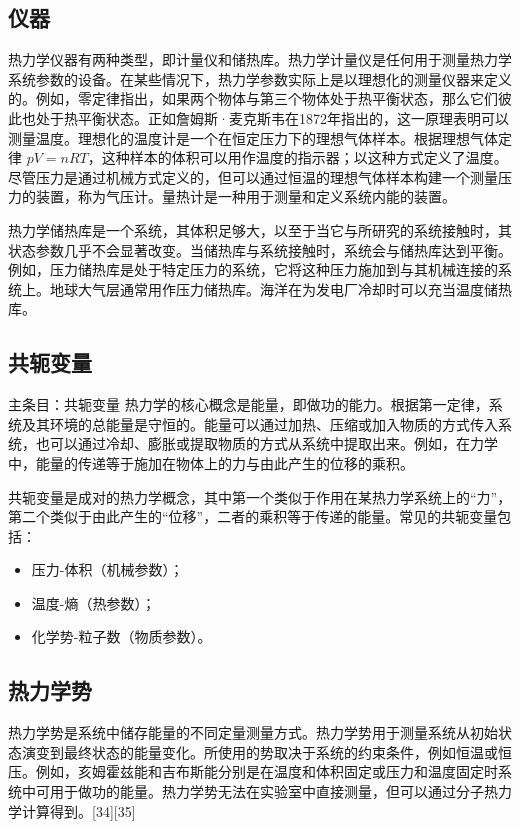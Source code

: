 \subsection{仪器} 
热力学仪器有两种类型，即计量仪和储热库。热力学计量仪是任何用于测量热力学系统参数的设备。在某些情况下，热力学参数实际上是以理想化的测量仪器来定义的。例如，零定律指出，如果两个物体与第三个物体处于热平衡状态，那么它们彼此也处于热平衡状态。正如詹姆斯·麦克斯韦在1872年指出的，这一原理表明可以测量温度。理想化的温度计是一个在恒定压力下的理想气体样本。根据理想气体定律 \( pV = nRT \)，这种样本的体积可以用作温度的指示器；以这种方式定义了温度。尽管压力是通过机械方式定义的，但可以通过恒温的理想气体样本构建一个测量压力的装置，称为气压计。量热计是一种用于测量和定义系统内能的装置。

热力学储热库是一个系统，其体积足够大，以至于当它与所研究的系统接触时，其状态参数几乎不会显著改变。当储热库与系统接触时，系统会与储热库达到平衡。例如，压力储热库是处于特定压力的系统，它将这种压力施加到与其机械连接的系统上。地球大气层通常用作压力储热库。海洋在为发电厂冷却时可以充当温度储热库。
\subsection{共轭变量}  
主条目：共轭变量  
热力学的核心概念是能量，即做功的能力。根据第一定律，系统及其环境的总能量是守恒的。能量可以通过加热、压缩或加入物质的方式传入系统，也可以通过冷却、膨胀或提取物质的方式从系统中提取出来。例如，在力学中，能量的传递等于施加在物体上的力与由此产生的位移的乘积。

共轭变量是成对的热力学概念，其中第一个类似于作用在某热力学系统上的“力”，第二个类似于由此产生的“位移”，二者的乘积等于传递的能量。常见的共轭变量包括：
\begin{itemize}
\item 压力-体积（机械参数）；
\item 温度-熵（热参数）；
\item 化学势-粒子数（物质参数）。
\end{itemize}
\subsection{热力学势}  
热力学势是系统中储存能量的不同定量测量方式。热力学势用于测量系统从初始状态演变到最终状态的能量变化。所使用的势取决于系统的约束条件，例如恒温或恒压。例如，亥姆霍兹能和吉布斯能分别是在温度和体积固定或压力和温度固定时系统中可用于做功的能量。热力学势无法在实验室中直接测量，但可以通过分子热力学计算得到。[34][35]

